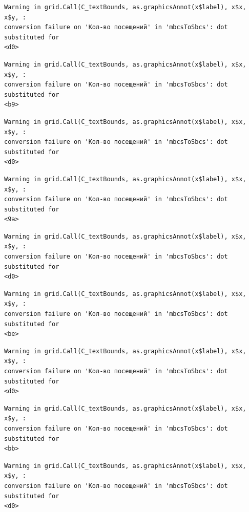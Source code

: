 \documentclass[
  letterpaper,
  DIV=11,
  numbers=noendperiod]{scrartcl}
\begin{document}
\begin{verbatim}
Warning in grid.Call(C_textBounds, as.graphicsAnnot(x$label), x$x, x$y, :
conversion failure on 'Кол-во посещений' in 'mbcsToSbcs': dot substituted for
<d0>
\end{verbatim}

\begin{verbatim}
Warning in grid.Call(C_textBounds, as.graphicsAnnot(x$label), x$x, x$y, :
conversion failure on 'Кол-во посещений' in 'mbcsToSbcs': dot substituted for
<b9>
\end{verbatim}

\begin{verbatim}
Warning in grid.Call(C_textBounds, as.graphicsAnnot(x$label), x$x, x$y, :
conversion failure on 'Кол-во посещений' in 'mbcsToSbcs': dot substituted for
<d0>
\end{verbatim}

\begin{verbatim}
Warning in grid.Call(C_textBounds, as.graphicsAnnot(x$label), x$x, x$y, :
conversion failure on 'Кол-во посещений' in 'mbcsToSbcs': dot substituted for
<9a>
\end{verbatim}

\begin{verbatim}
Warning in grid.Call(C_textBounds, as.graphicsAnnot(x$label), x$x, x$y, :
conversion failure on 'Кол-во посещений' in 'mbcsToSbcs': dot substituted for
<d0>
\end{verbatim}

\begin{verbatim}
Warning in grid.Call(C_textBounds, as.graphicsAnnot(x$label), x$x, x$y, :
conversion failure on 'Кол-во посещений' in 'mbcsToSbcs': dot substituted for
<be>
\end{verbatim}

\begin{verbatim}
Warning in grid.Call(C_textBounds, as.graphicsAnnot(x$label), x$x, x$y, :
conversion failure on 'Кол-во посещений' in 'mbcsToSbcs': dot substituted for
<d0>
\end{verbatim}

\begin{verbatim}
Warning in grid.Call(C_textBounds, as.graphicsAnnot(x$label), x$x, x$y, :
conversion failure on 'Кол-во посещений' in 'mbcsToSbcs': dot substituted for
<bb>
\end{verbatim}

\begin{verbatim}
Warning in grid.Call(C_textBounds, as.graphicsAnnot(x$label), x$x, x$y, :
conversion failure on 'Кол-во посещений' in 'mbcsToSbcs': dot substituted for
<d0>
\end{verbatim}
\end{document}
